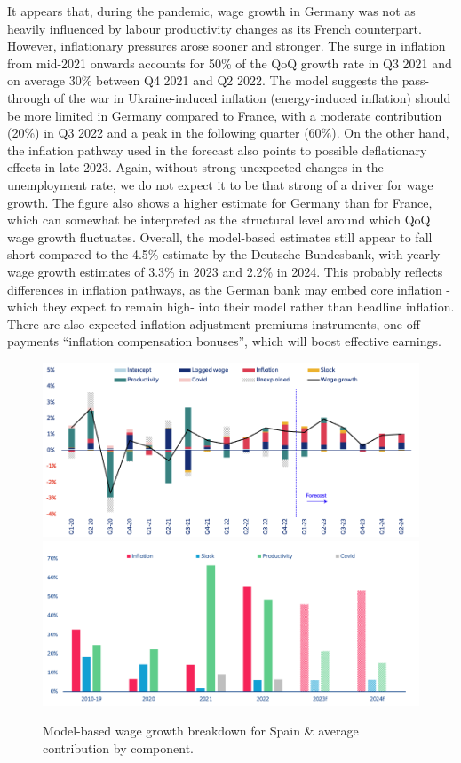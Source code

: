 It appears that, during the pandemic, wage growth in Germany was not as heavily influenced by labour productivity changes as its French counterpart. 
However, inflationary pressures arose sooner and stronger. 
The surge in inflation from mid-2021 onwards accounts for 50\% of the QoQ growth rate in Q3 2021 and on average 30\% between Q4 2021 and Q2 2022. 
The model suggests the pass-through of the war in Ukraine-induced inflation (energy-induced inflation) should be more limited in Germany compared to France, with a moderate contribution (20\%) in Q3 2022 and a peak in the following quarter (60\%). 
On the other hand, the inflation pathway used in the forecast also points to possible deflationary effects in late 2023. 
Again, without strong unexpected changes in the unemployment rate, we do not expect it to be that strong of a driver for wage growth. 
The figure also shows a higher estimate for Germany than for France, which can somewhat be interpreted as the structural level around which QoQ wage growth fluctuates. 
Overall, the model-based estimates still appear to fall short compared to the 4.5\% estimate by the Deutsche Bundesbank, with yearly wage growth estimates of 3.3\% in 2023 and 2.2\% in 2024. 
This probably reflects differences in inflation pathways, as the German bank may embed core inflation -which they expect to remain high- into their model rather than headline inflation. 
There are also expected inflation adjustment premiums instruments, one-off payments “inflation compensation bonuses”, which will boost effective earnings. 

\begin{figure}[H]
    \centering
    \caption{Model-based wage growth breakdown for Spain \& average contribution by component.}
    \includegraphics[width=.8\textwidth]{Core/2.Labour/img/spainb1.png}
    \includegraphics[width=.8\textwidth]{Core/2.Labour/img/spainb2.png}
    \label{figure:spbreakdown}
\end{figure}


